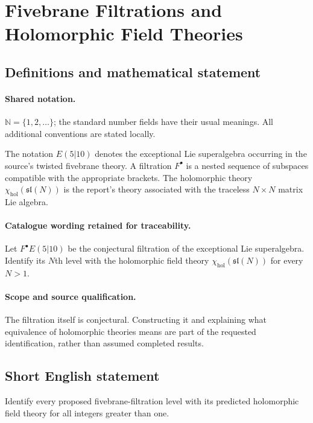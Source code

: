 \documentclass[11pt]{article}
\begin{document}
\section{Fivebrane Filtrations and Holomorphic Field Theories}\label{statement}

\subsection{Definitions and mathematical statement}

\paragraph{Shared notation.}$\mathbb N=\{1,2,\ldots\}$; the standard number fields have their usual meanings. All additional conventions are stated locally.


The notation $E(5|10)$ denotes the exceptional Lie superalgebra occurring in the source's twisted fivebrane theory. A filtration $F^\bullet$ is a nested sequence of subspaces compatible with the appropriate brackets. The holomorphic theory $\chi_{\mathrm{hol}}(\mathfrak{sl}(N))$ is the report's theory associated with the traceless $N\times N$ matrix Lie algebra.

\paragraph{Catalogue wording retained for traceability.}
Let $F^\bullet E(5|10)$ be the conjectural filtration of the exceptional Lie superalgebra. Identify its $N$th level with the holomorphic field theory $\chi_{\mathrm{hol}}(\mathfrak{sl}(N))$ for every $N>1$.

\paragraph{Scope and source qualification.}The filtration itself is conjectural. Constructing it and explaining what equivalence of holomorphic theories means are part of the requested identification, rather than assumed completed results.
\subsection{Short English statement}
Identify every proposed fivebrane-filtration level with its predicted holomorphic field theory for all integers greater than one.
\end{document}
